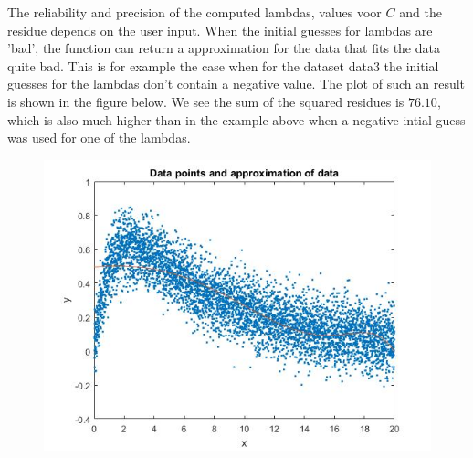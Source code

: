\documentclass[12pt]{article}
\begin{document}
The reliability and precision of the computed lambdas, values voor $C$ and the residue depends on the user input. When the initial guesses for lambdas are 'bad', the function can return a approximation for the data that fits the data quite bad. This is for example the case when for the dataset data3 the initial guesses for the lambdas don't contain a negative value. The plot of such an result is shown in the figure below. We see the sum of the squared residues is $76.10$, which is also much higher than in the example above when a negative intial guess was used for one of the lambdas.
\begin{figure}[H]
\centering
\includegraphics[width=0.6\linewidth,natwidth=610,natheight=642]{ex1_badplot.jpg}
\label{ex1_badplot}
\end{figure}
\end{document}

